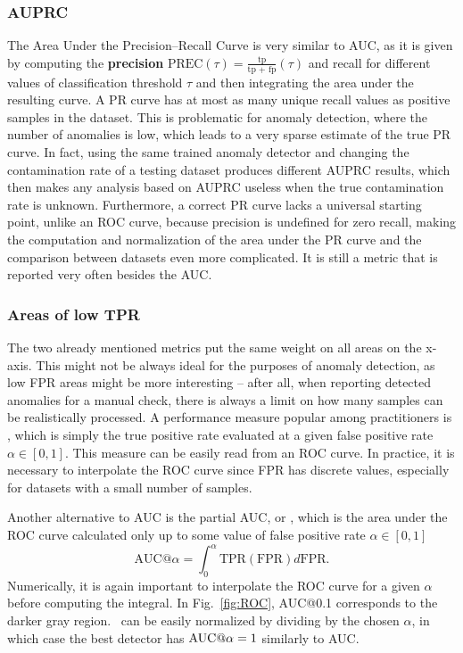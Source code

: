 \subsubsection{AUPRC}
The Area Under the Precision--Recall Curve is very similar to AUC, as it is given by computing the \textbf{precision} $\text{PREC}(\tau)=\frac{\text{tp}}{\text{tp + fp}}(\tau)$ and recall for different values of classification threshold $\tau$ and then integrating the area under the resulting curve. A PR curve has at most as many unique recall values as positive samples in the dataset. This is problematic for anomaly detection, where the number of anomalies is low, which leads to a very sparse estimate of the true PR curve. In fact, using the same trained anomaly detector and changing the contamination rate of a testing dataset produces different AUPRC results, which then makes any analysis based on AUPRC useless when the true contamination rate is unknown. Furthermore, a correct PR curve lacks a universal starting point, unlike an ROC curve, because precision is undefined for zero recall, making the computation and normalization of the area under the PR curve and the comparison between datasets even more complicated. It is still a metric that is reported very often besides the AUC.

\subsubsection{Areas of low TPR}
The two already mentioned metrics put the same weight on all areas on the x-axis. This might not be always ideal for the purposes of anomaly detection, as low FPR areas might be more interesting -- after all, when reporting detected anomalies for a manual check, there is always a limit on how many samples can be realistically processed. A performance measure popular among practitioners is \textbf{\tpra}, which is simply the true positive rate evaluated at a given false positive rate $\alpha \in [0,1]$. This measure can be easily read from an ROC curve. In practice, it is necessary to interpolate the ROC curve since FPR has discrete values, especially for datasets with a small number of samples. 

Another alternative to AUC is the partial AUC, or \textbf{\auca}, which is the area under the ROC curve calculated only up to some value of false positive rate $\alpha \in [0,1]$
\begin{equation} \label{eq:auc_alpha}
    \text{AUC@}\alpha = \int_0^{\alpha}\text{TPR}(\text{FPR})d\text{FPR}.
    \end{equation}    
Numerically, it is again important to interpolate the ROC curve for a given $\alpha$ before computing the integral. In Fig.~\ref{fig:ROC}, AUC@0.1 corresponds to the darker gray region. \auca\ can be easily normalized by dividing by the chosen $\alpha$, in which case the best detector has $\textrm{AUC@}\alpha = 1$ similarly to AUC.

